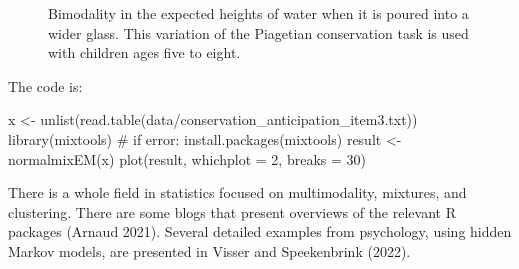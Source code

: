 \documentclass[
  a4paper,
  DIV=11,
  numbers=noendperiod,
  oneside]{scrreprt}
\newenvironment{Shaded}{}{}
\newcommand{\AttributeTok}[1]{\textcolor[rgb]{0.84,0.23,0.29}{#1}}
\newcommand{\CommentTok}[1]{\textcolor[rgb]{0.42,0.45,0.49}{#1}}
\newcommand{\DecValTok}[1]{\textcolor[rgb]{0.00,0.36,0.77}{#1}}
\newcommand{\FunctionTok}[1]{\textcolor[rgb]{0.44,0.26,0.76}{#1}}
\newcommand{\NormalTok}[1]{\textcolor[rgb]{0.14,0.16,0.18}{#1}}
\newcommand{\OtherTok}[1]{\textcolor[rgb]{0.44,0.26,0.76}{#1}}
\newcommand{\StringTok}[1]{\textcolor[rgb]{0.01,0.18,0.38}{#1}}
\begin{document}
\begin{figure}


\caption{\label{fig-ch3-img20-old-32}Bimodality in the expected heights
of water when it is poured into a wider glass. This variation of the
Piagetian conservation task is used with children ages five to eight.}

\end{figure}%

The code is:

\begin{Shaded}
\begin{Highlighting}[]
\NormalTok{x }\OtherTok{\textless{}{-}} \FunctionTok{unlist}\NormalTok{(}\FunctionTok{read.table}\NormalTok{(}\StringTok{\textquotesingle{}data/conservation\_anticipation\_item3.txt\textquotesingle{}}\NormalTok{))}
\FunctionTok{library}\NormalTok{(mixtools) }\CommentTok{\# if error: install.packages(\textquotesingle{}mixtools\textquotesingle{})}
\NormalTok{result }\OtherTok{\textless{}{-}} \FunctionTok{normalmixEM}\NormalTok{(x)}
\FunctionTok{plot}\NormalTok{(result, }\AttributeTok{whichplot =} \DecValTok{2}\NormalTok{, }\AttributeTok{breaks =} \DecValTok{30}\NormalTok{)}
\end{Highlighting}
\end{Shaded}

There is a whole field in statistics focused on multimodality, mixtures,
and clustering. There are some blogs that present overviews of the
relevant R packages (Arnaud 2021). Several detailed examples from
psychology, using hidden Markov models, are presented in Visser and
Speekenbrink (2022).
\end{document}
